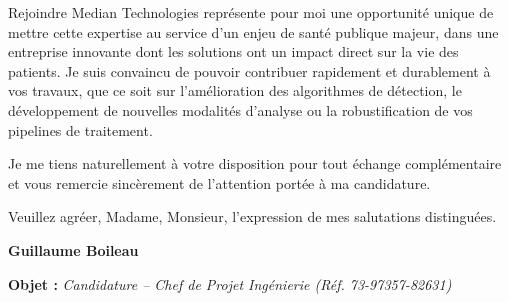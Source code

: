 \documentclass[11pt,a4paper]{../_shared/altacv}
\begin{document}
{Rejoindre Median Technologies représente pour moi une opportunité unique de mettre cette expertise au service d'un enjeu de santé publique majeur, dans une entreprise innovante dont les solutions ont un impact direct sur la vie des patients. Je suis convaincu de pouvoir contribuer rapidement et durablement à vos travaux, que ce soit sur l'amélioration des algorithmes de détection, le développement de nouvelles modalités d'analyse ou la robustification de vos pipelines de traitement.

Je me tiens naturellement à votre disposition pour tout échange complémentaire et vous remercie sincèrement de l'attention portée à ma candidature.

Veuillez agréer, Madame, Monsieur, l'expression de mes salutations distinguées.

\textbf{Guillaume Boileau}

}

{\color{accent}\textbf{Objet :}} \textit{Candidature -- Chef de Projet Ingénierie (Réf. 73-97357-82631)}
\end{document}
